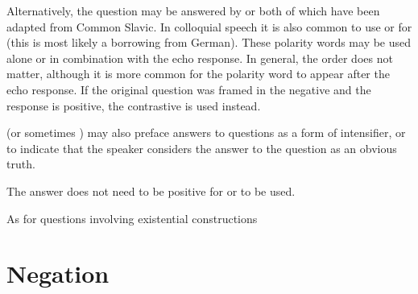 Alternatively, the question may be answered by  or  both of which have been adapted from Common Slavic. In colloquial speech it is also common to use  or  for  (this is most likely a borrowing from German). These polarity words may be used alone or in combination with the echo response. In general, the order does not matter, although it is more common for the polarity word to appear after the echo response. If the original question was framed in the negative and the response is positive, the contrastive  is used instead.

\ex
{}\xe

\ex{}
\xe

 (or sometimes ) may also preface answers to questions as a form of intensifier, or to indicate that the speaker considers the answer to the question as an obvious truth.

\ex
{}\xe

The answer does not need to be positive for  or  to be used.

\ex{}
\xe


As for questions involving existential constructions


\section{Negation}

